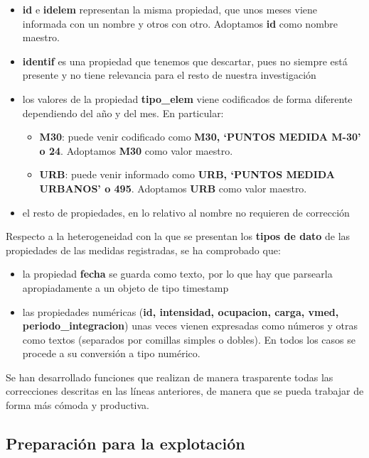 \documentclass[]{book}
\providecommand{\tightlist}{%
  \setlength{\itemsep}{0pt}\setlength{\parskip}{0pt}}
\begin{document}
\begin{itemize}
\tightlist
\item
  \textbf{id} e \textbf{idelem} representan la misma propiedad, que unos
  meses viene informada con un nombre y otros con otro. Adoptamos
  \textbf{id} como nombre maestro.
\item
  \textbf{identif} es una propiedad que tenemos que descartar, pues no
  siempre está presente y no tiene relevancia para el resto de nuestra
  investigación
\item
  los valores de la propiedad \textbf{tipo\_elem} viene codificados de
  forma diferente dependiendo del año y del mes. En particular:

  \begin{itemize}
  \tightlist
  \item
    \textbf{M30}: puede venir codificado como \textbf{M30, `PUNTOS
    MEDIDA M-30' o 24}. Adoptamos \textbf{M30} como valor maestro.
  \item
    \textbf{URB}: puede venir informado como \textbf{URB, `PUNTOS MEDIDA
    URBANOS' o 495}. Adoptamos \textbf{URB} como valor maestro.
  \end{itemize}
\item
  el resto de propiedades, en lo relativo al nombre no requieren de
  corrección
\end{itemize}

Respecto a la heterogeneidad con la que se presentan los \textbf{tipos
de dato} de las propiedades de las medidas registradas, se ha comprobado
que:

\begin{itemize}
\tightlist
\item
  la propiedad \textbf{fecha} se guarda como texto, por lo que hay que
  parsearla apropiadamente a un objeto de tipo timestamp
\item
  las propiedades numéricas (\textbf{id, intensidad, ocupacion, carga,
  vmed, periodo\_integracion}) unas veces vienen expresadas como números
  y otras como textos (separados por comillas simples o dobles). En
  todos los casos se procede a su conversión a tipo numérico.
\end{itemize}

Se han desarrollado funciones que realizan de manera trasparente todas
las correcciones descritas en las líneas anteriores, de manera que se
pueda trabajar de forma más cómoda y productiva.

\subsection{Preparación para la
explotación}\label{preparacion-para-la-explotacion}
\end{document}
